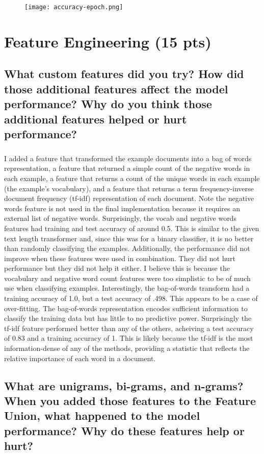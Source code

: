 \documentclass[11pt]{article}
\begin{document}
\begin{figure}[h]
	\texttt{[image: accuracy-epoch.png]}
	\label{fig:graph}
\end{figure}

\section{Feature Engineering (15 pts)}

\subsection{What custom features did you try? How did those additional features affect the model performance? Why do you think those additional features helped or hurt performance?}

\subparagraph{}

I added a feature that transformed the example documents into a bag of words representation, a feature that returned a simple count of the negative words in each example, a feature that returns a count of the unique words in each example (the example’s vocabulary), and a feature that returns a term frequency-inverse document frequency (tf-idf) representation of each document. Note the negative words feature is not used in the final implementation because it requires an external list of negative words. Surprisingly, the vocab and negative words features had training and test accuracy of around 0.5. This is similar to the given text length transformer and, since this was for a binary classifier, it is no better than randomly classifying the examples. Additionally, the performance did not improve when these features were used in combination. They did not hurt performance but they did not help it either. I believe this is because the vocabulary and negative word count features were too simplistic to be of much use when classifying examples. Interestingly, the bag-of-words transform had a training accuracy of 1.0, but a test accuracy of .498. This appears to be a case of over-fitting. The bag-of-words representation encodes sufficient information to classify the training data but has little to no predictive power. Surprisingly the tf-idf feature performed better than any of the others, acheiving a test accuracy of 0.83 and a training accuracy of 1. This is likely because the tf-idf is the most information-dense of any of the methods, providing a statistic that reflects the relative importance of each word in a document.

\subsection{What are unigrams, bi-grams, and n-grams? When you added those features to the Feature Union, what happened to the model performance? Why do these features help or hurt?}
\end{document}
